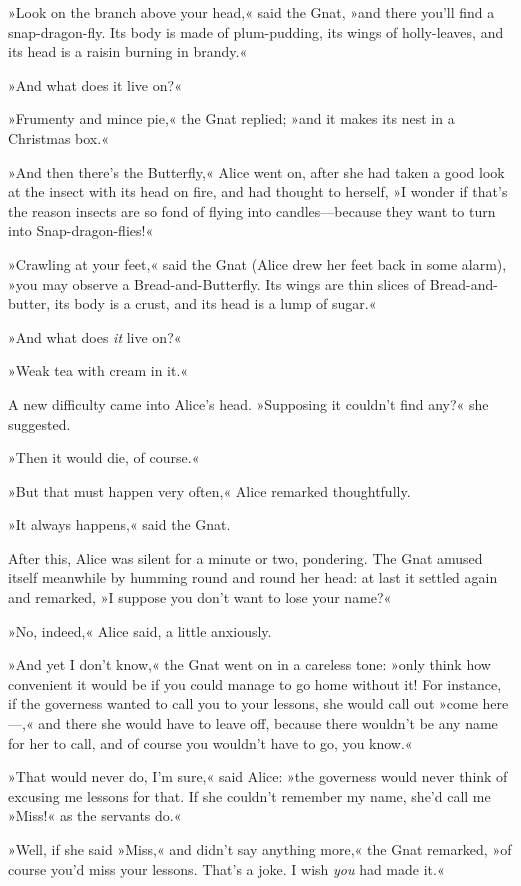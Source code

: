 »Look on the branch above your head,« said the Gnat, »and there you'll find a snap-dragon-fly. Its body is made of plum-pudding, its wings of holly-leaves, and its head is a raisin burning in brandy.«

»And what does it live on?«

»Frumenty and mince pie,« the Gnat replied; »and it makes its nest in a Christmas box.«

»And then there's the Butterfly,« Alice went on, after she had taken a good look at the insect with its head on fire, and had thought to herself, »I wonder if that's the reason insects are so fond of flying into candles—because they want to turn into Snap-dragon-flies!«

»Crawling at your feet,« said the Gnat (Alice drew her feet back in some alarm), »you may observe a Bread-and-Butterfly. Its wings are thin slices of Bread-and-butter, its body is a crust, and its head is a lump of sugar.«

»And what does \textit{it} live on?«

»Weak tea with cream in it.«

A new difficulty came into Alice's head. »Supposing it couldn't find any?« she suggested.

»Then it would die, of course.«

»But that must happen very often,« Alice remarked thoughtfully.

»It always happens,« said the Gnat.

After this, Alice was silent for a minute or two, pondering. The Gnat amused itself meanwhile by humming round and round her head: at last it settled again and remarked, »I suppose you don't want to lose your name?«

»No, indeed,« Alice said, a little anxiously.

»And yet I don't know,« the Gnat went on in a careless tone: »only think how convenient it would be if you could manage to go home without it! For instance, if the governess wanted to call you to your lessons, she would call out »come here—,« and there she would have to leave off, because there wouldn't be any name for her to call, and of course you wouldn't have to go, you know.«

»That would never do, I'm sure,« said Alice: »the governess would never think of excusing me lessons for that. If she couldn't remember my name, she'd call me »Miss!« as the servants do.«

»Well, if she said »Miss,« and didn't say anything more,« the Gnat remarked, »of course you'd miss your lessons. That's a joke. I wish \textit{you} had made it.«

